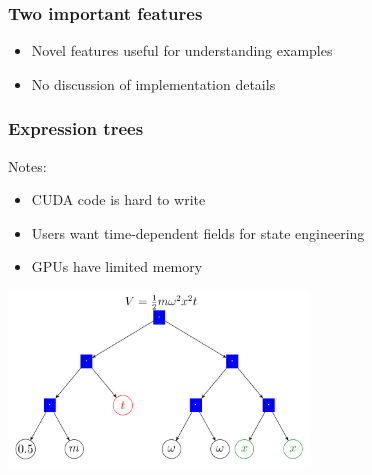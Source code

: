 \documentclass{beamer}
\begin{document}
\begin{frame}
\frametitle{Two important features}

\begin{itemize}
\item Novel features useful for understanding examples
\item No discussion of implementation details
\end{itemize}
\end{frame}


\begin{frame}
\frametitle{Expression trees}
Notes:
\begin{itemize}
\item CUDA code is hard to write
\item Users want time-dependent fields for state engineering
\item GPUs have limited memory
\end{itemize}

\pause
\center \includegraphics[width=0.6\textwidth]{expr_tree.png}
\end{frame}
\end{document}
